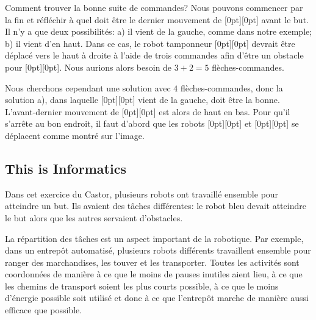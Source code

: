 \documentclass[a4paper,11pt]{report}
\newcommand{\taskGraphicsFolder}{..}
\begin{document}
{\centering%
\par}

Comment trouver la bonne suite de commandes? Nous pouvons commencer par la fin et réfléchir à quel doit être le dernier mouvement de \raisebox{-0.5ex}[0pt][0pt]{} avant le but. Il n’y a que deux possibilités: a) il vient de la gauche, comme dans notre exemple; b) il vient d’en haut. Dans ce cas, le robot tamponneur \raisebox{-0.5ex}[0pt][0pt]{} devrait être déplacé vers le haut à droite à l’aide de trois commandes afin d’être un obstacle pour \raisebox{-0.5ex}[0pt][0pt]{}. Nous aurions alors besoin de ${3 + 2 = 5}$ flèches-commandes.

Nous cherchons cependant une solution avec $4$ flèches-commandes, donc la solution a), dans laquelle \raisebox{-0.5ex}[0pt][0pt]{} vient de la gauche, doit être la bonne. L’avant-dernier mouvement de \raisebox{-0.5ex}[0pt][0pt]{} est alors de haut en bas. Pour qu’il s’arrête au bon endroit, il faut d’abord que les robots \raisebox{-0.5ex}[0pt][0pt]{} et \raisebox{-0.5ex}[0pt][0pt]{} se déplacent comme montré sur l’image.


\subsection*{This is Informatics}

Dans cet exercice du Castor, plusieurs robots ont travaillé ensemble pour atteindre un but. Ils avaient des tâches différentes: le robot bleu devait atteindre le but alors que les autres servaient d’obstacles.

La répartition des tâches est un aspect important de la robotique. Par exemple, dans un entrepôt automatisé, plusieurs robots différents travaillent ensemble pour ranger des marchandises, les touver et les transporter. Toutes les activités sont coordonnées de manière à ce que le moins de pauses inutiles aient lieu, à ce que les chemins de transport soient les plus courts possible, à ce que le moins d’énergie possible soit utilisé et donc à ce que l’entrepôt marche de manière aussi efficace que possible.
\end{document}
